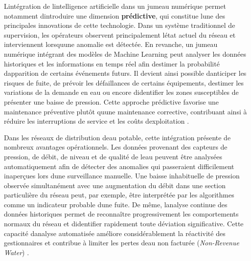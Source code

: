 \documentclass[12pt,a4paper,oneside]{report}
\begin{document}
L\textquotesingle intégration de l\textquotesingle intelligence
artificielle dans un jumeau numérique permet notamment
d\textquotesingle introduire une dimension \textbf{prédictive}, qui
constitue l\textquotesingle une des principales innovations de cette
technologie. Dans un système traditionnel de supervision, les opérateurs
observent principalement l\textquotesingle état actuel du réseau et
interviennent lorsqu\textquotesingle une anomalie est détectée. En
revanche, un jumeau numérique intégrant des modèles de Machine Learning
peut analyser les données historiques et les informations en temps réel
afin d\textquotesingle estimer la probabilité
d\textquotesingle apparition de certains événements futurs. Il devient
ainsi possible d\textquotesingle anticiper les risques de fuite, de
prévoir les défaillances de certains équipements,
d\textquotesingle estimer les variations de la demande en eau ou encore
d\textquotesingle identifier les zones susceptibles de présenter une
baisse de pression. Cette approche prédictive favorise une maintenance
préventive plutôt qu\textquotesingle une maintenance corrective,
contribuant ainsi à réduire les interruptions de service et les coûts
d\textquotesingle exploitation \cite{ref61}.

Dans les réseaux de distribution d\textquotesingle eau potable, cette
intégration présente de nombreux avantages opérationnels. Les données
provenant des capteurs de pression, de débit, de niveau et de qualité de
l\textquotesingle eau peuvent être analysées automatiquement afin de
détecter des anomalies qui passeraient difficilement inaperçues lors
d\textquotesingle une surveillance manuelle. Une baisse inhabituelle de
pression observée simultanément avec une augmentation du débit dans une
section particulière du réseau peut, par exemple, être interprétée par
les algorithmes comme un indicateur probable d\textquotesingle une
fuite. De même, l\textquotesingle analyse continue des données
historiques permet de reconnaître progressivement les comportements
normaux du réseau et d\textquotesingle identifier rapidement toute
déviation significative. Cette capacité d\textquotesingle analyse
automatisée améliore considérablement la réactivité des gestionnaires et
contribue à limiter les pertes d\textquotesingle eau non facturée
(\emph{Non-Revenue Water}) \cite{ref20}.
\end{document}

